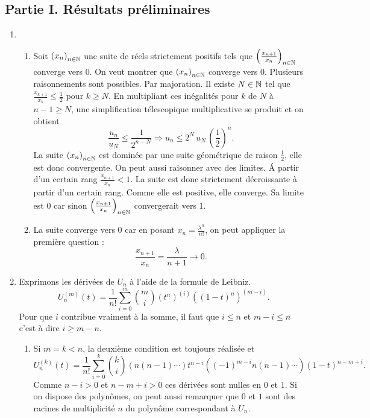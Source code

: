 \subsection*{Partie I. Résultats préliminaires}
\begin{enumerate}
 \item 
 \begin{enumerate}
   \item Soit $\left( x_n \right)_{n \in \mathbb{N}}$ une suite de réels strictement positifs tels que $\left( \frac{x_{n+1}}{x_n} \right)_{n \in \mathbb{N}}$ converge vers 0. On veut montrer que $\left( x_n \right)_{n \in \mathbb{N}}$ converge vers 0. Plusieurs raisonnements sont possibles.\newline
Par majoration.\newline
Il existe $N\in \mathbb{N}$ tel que $\frac{x_{k+1}}{x_k}\leq \frac{1}{2}$ pour $k\geq N$. En multipliant ces inégalités pour $k$ de $N$ à $n-1 \geq N$, une simplification télescopique multiplicative se produit et on obtient
\[
 \frac{u_n}{u_N} \leq \frac{1}{2^{n-N}} \Rightarrow u_n \leq 2^N\,u_N \, \left(\frac{1}{2}\right)^n.
\]
La suite $\left( x_n \right)_{n \in \mathbb{N}}$ est dominée par une suite géométrique de raison $\frac{1}{2}$, elle est donc convergente.\newline
On peut aussi raisonner avec des limites.\newline
\'A partir d'un certain rang $\frac{x_{n+1}}{x_n} < 1$. La suite est donc strictement décroissante à partir d'un certain rang. Comme elle est positive, elle converge. Sa limite est 0 car sinon $\left( \frac{x_{n+1}}{x_n} \right)_{n \in \mathbb{N}}$ convergerait vers $1$.

   \item La suite converge vers $0$ car en posant $x_n = \frac{\lambda^n}{n!}$, on peut appliquer la première question : 
\[
 \frac{x_{n+1}}{x_n} = \frac{\lambda}{n+1} \rightarrow 0.
\]

 \end{enumerate}

 \item Exprimons les dérivées de $U_n$ à l'aide de la formule de Leibniz.
\[
 U_n^{(m)}(t) = \frac{1}{n!}\sum_{i=0}^{m}\binom{m}{i}(t^n)^{(i)}((1-t)^n)^{(m-i)}.
\]
Pour que $i$ contribue vraiment à la somme, il faut que $i \leq n$ et $m - i \leq n$ c'est à dire $i \geq m-n$. 
  \begin{enumerate}
    \item Si $m = k < n$, la deuxième condition est toujours réalisée et
\[
 U_n^{(k)}(t) = \frac{1}{n!}\sum_{i=0}^{k}\binom{k}{i}\left( n(n-1)\cdots\right) t^{n-i}\left((-1)^{m-i}n(n-1)\cdots \right) (1-t)^{n-m+i}.
\]
Comme $n-i > 0$ et $n-m+i > 0$ ces dérivées sont nulles en $0$ et $1$.\newline
Si on dispose des polynômes, on peut aussi remarquer que $0$ et $1$ sont des racines de multiplicité $n$ du polynôme correspondant à $U_n$. 
   

\end{enumerate}
\end{enumerate}
